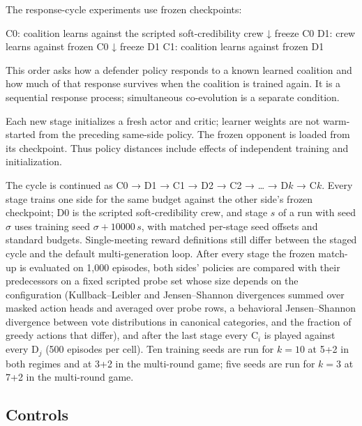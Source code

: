 \documentclass[
  12pt,
]{article}
\newenvironment{Shaded}{}{}
\newcommand{\NormalTok}[1]{#1}
\begin{document}
The response-cycle experiments use frozen checkpoints:

\begin{Shaded}
\begin{Highlighting}[]
\NormalTok{C0: coalition learns against the scripted soft{-}credibility crew}
\NormalTok{  ↓ freeze C0}
\NormalTok{D1: crew learns against frozen C0}
\NormalTok{  ↓ freeze D1}
\NormalTok{C1: coalition learns against frozen D1}
\end{Highlighting}
\end{Shaded}

This order asks how a defender policy responds to a known learned
coalition and how much of that response survives when the coalition is
trained again. It is a sequential response process; simultaneous
co-evolution is a separate condition.

Each new stage initializes a fresh actor and critic; learner weights are
not warm-started from the preceding same-side policy. The frozen
opponent is loaded from its checkpoint. Thus policy distances include
effects of independent training and initialization.

The cycle is continued as C0 → D1 → C1 → D2 → C2 → \ldots{} → D\(k\) →
C\(k\). Every stage trains one side for the same budget against the
other side's frozen checkpoint; D0 is the scripted soft-credibility
crew, and stage \(s\) of a run with seed \(\sigma\) uses training seed
\(\sigma + 10000\,s\), with matched per-stage seed offsets and standard
budgets. Single-meeting reward definitions still differ between the
staged cycle and the default multi-generation loop. After every stage
the frozen match-up is evaluated on 1,000 episodes, both sides' policies
are compared with their predecessors on a fixed scripted probe set whose
size depends on the configuration (Kullback--Leibler and Jensen--Shannon
divergences summed over masked action heads and averaged over probe
rows, a behavioral Jensen--Shannon divergence between vote distributions
in canonical categories, and the fraction of greedy actions that
differ), and after the last stage every C\(_i\) is played against every
D\(_j\) (500 episodes per cell). Ten training seeds are run for
\(k = 10\) at 5+2 in both regimes and at 3+2 in the multi-round game;
five seeds are run for \(k = 3\) at 7+2 in the multi-round game.

\FloatBarrier

\subsection{Controls}\label{controls}
\end{document}
